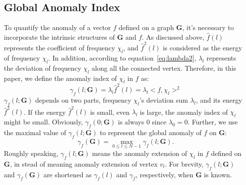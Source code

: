\documentclass[conference]{IEEEtran}
\begin{document}
\subsection{Global Anomaly Index}
\label{sec:signal_anomaly_on_Graph}

To quantify the anomaly of a vector $f$ defined on a graph $\mathbf{G}$, it's necessary to incorporate the intrinsic structures of $\mathbf{G}$ and $f$. As discussed above, $\hat{f}(l)$ represents the coefficient of frequency $\chi_l$, and $\hat{f}^2(l)$ is considered as the energy of frequency $\chi_l$. In addition, according to equation~\ref{eq:lambda2}, $\lambda_l$ represents the deviation of frequency $\chi_l$ along all the connected vertex. Therefore, in this paper, we define the anomaly index of $\chi_l$ in $f$ as:
\begin{equation}
\label{eq:lambda3}
\gamma_f(l;\mathbf{G})=\lambda_l\hat{f}^2(l)= \lambda_l<f,\chi_l>^2
\end{equation}
$\gamma_f(l;\mathbf{G})$ depends on two parts, frequency $\chi_l$'s deviation sum $\lambda_l$, and its energy $\hat{f}^2(l)$. If the energy $\hat{f}^2(l)$ is small, even $\lambda_l$ is large, the anomaly index of $\chi_l$ might be small. Obviously, $\gamma_f(0;\mathbf{G})$ is always $0$ since $\lambda_0=0$. Further, we use the maximal value of $\gamma_f(l;\mathbf{G})$ to represent the global anomaly of $f$ on $\mathbf{G}$:
\begin{equation}
\label{eq:lambda4}
\gamma_f(\mathbf{G})=\underset{0 \leq l \leq N-1}{\max}{\gamma_f(l;\mathbf{G})}.
\end{equation}
Roughly speaking, $\gamma_f(l;\mathbf{G})$ means the anomaly extension of $\chi_l$ in $f$ defined on $\mathbf{G}$, in stead of meaning anomaly extension of vertex $v_l$.
For brevity, $\gamma_f(l;\mathbf{G})$  and $\gamma_f(\mathbf{G})$ are shortened as $\gamma_f(l)$ and $\gamma_f$, respectively, when $\mathbf{G}$ is known.
\end{document}
